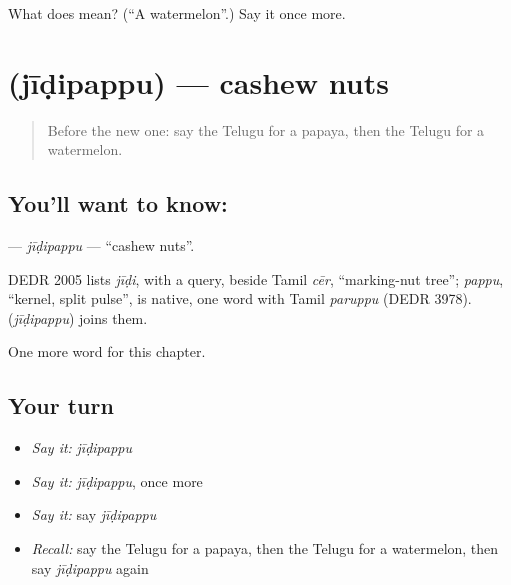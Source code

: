 \begin{tcolorbox}[breakable,colback=teal!4,colframe=teal!35!black,title={Before you move on}]
What does  mean? (\textquotedblleft{}A watermelon\textquotedblright{}.) Say it once more.
\end{tcolorbox}
\section[\texorpdfstring{\te{జీడిపప్పు} (jīḍipappu)}{జీడిపప్పు (jīḍipappu)}]{ (jīḍipappu) — cashew nuts}

\label{lesson:TE-C225-jidipappu}



\begin{quote}
Before the new one: say the Telugu for a papaya, then the Telugu for a watermelon.
\end{quote}

\subsection*{You'll want to know: }
\textbf{} — \emph{jīḍipappu} — \textquotedblleft{}cashew nuts\textquotedblright{}.

\begin{cousinweb}
DEDR 2005 lists \emph{jīḍi}, with a query, beside Tamil \emph{cēr}, \textquotedblleft{}marking-nut tree\textquotedblright{}; \emph{pappu}, \textquotedblleft{}kernel, split pulse\textquotedblright{}, is native, one word with Tamil \emph{paruppu} (DEDR 3978). \textbf{} (\emph{jīḍipappu}) joins them.
\end{cousinweb}

\begin{grammarlens}[title={What you've built}]
One more word for this chapter.
\end{grammarlens}

\subsection*{Your turn}
\begin{itemize}
\raggedright
  \item \emph{Say it:} \emph{jīḍipappu}
  \item \emph{Say it:} \emph{jīḍipappu}, once more
  \item \emph{Say it:} say \emph{jīḍipappu}
  \item \emph{Recall:} say the Telugu for a papaya, then the Telugu for a watermelon, then say \emph{jīḍipappu} again
\end{itemize}

